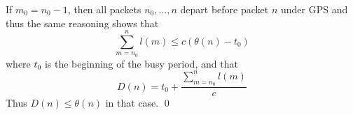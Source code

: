  If $m_0 = n_0-1$, then all packets $n_0,...,n$ depart before packet $n$
 under GPS and thus the same reasoning shows that
 $$ \sum_{m=n_0}^n l(m) \leq c \left(\theta(n) - t_0\right) $$
 where $t_0$ is the beginning of the busy period, and that
 $$D(n) = t_0 + \frac{\sum_{m=n_0 }^n l(m)}{c}
 $$
 Thus $D(n) \leq \theta(n)$ in that case. \qed
